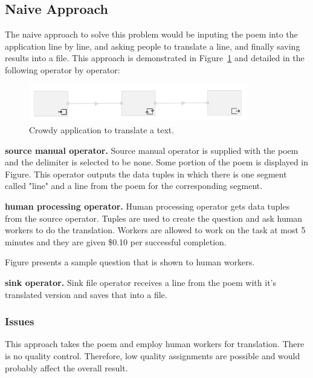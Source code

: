 \subsection{Naive Approach}
The naive approach to solve this problem would be inputing the poem into the application line by line, and asking people to translate a line, and finally saving results into a file. This approach is demonstrated in Figure~\ref{fig:scenario2} and detailed in the following operator by operator:

\begin{figure}[ht]
	\centering
	\includegraphics[width=0.85\textwidth]{figures/scenarios/naive.png}
	\caption{Crowdy application to translate a text.}
	\label{fig:scenario2}
\end{figure}

\textbf{source manual operator.}
Source manual operator is supplied with the poem and the delimiter is selected to be none. Some portion of the poem is displayed in Figure. This operator outputs the data tuples in which there is one segment called "line" and a line from the poem for the corresponding segment.


\textbf{human processing operator.}
Human processing operator gets data tuples from the source operator. Tuples are used to create the question and ask human workers to do the translation. Workers are allowed to work on the task at most 5 minutes and they are given \$0.10 per successful completion.

Figure presents a sample question that is shown to human workers.


\textbf{sink operator.}
Sink file operator receives a line from the poem with it's translated version and saves that into a file.


\subsubsection{Issues}
This approach takes the poem and employ human workers for translation. There is no quality control. Therefore, low quality assignments are possible and would probably affect the overall result.

